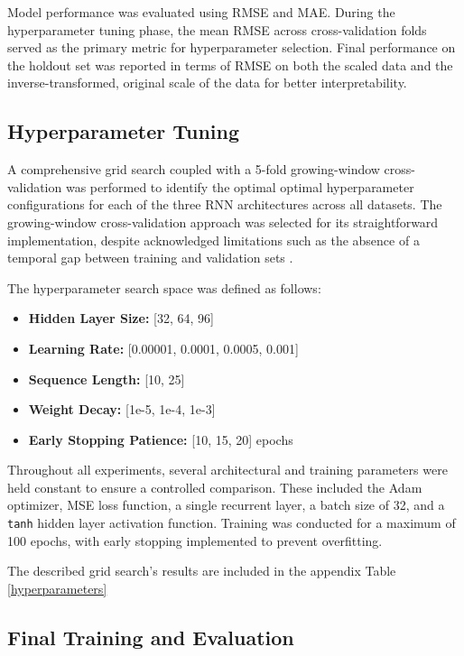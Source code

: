 \documentclass[conference, 10pt]{IEEEtran}
\begin{document}
Model performance was evaluated using RMSE and MAE. During the hyperparameter tuning phase, the mean RMSE across
cross-validation folds served as the primary metric for hyperparameter selection. Final performance on the holdout set
was reported in terms of RMSE on both the scaled data and the inverse-transformed, original scale of the data for better
interpretability.

\subsection{Hyperparameter Tuning}
A comprehensive grid search coupled with a 5-fold growing-window cross-validation was performed to identify the optimal
optimal hyperparameter configurations for each of the three RNN architectures across all datasets. The growing-window
cross-validation approach was selected for its straightforward implementation, despite acknowledged limitations such as
the absence of a temporal gap between training and validation sets \cite{CrossValidationTimeseries}.

The hyperparameter search space was defined as follows:

\begin{itemize}
    \item \textbf{Hidden Layer Size:} [32, 64, 96]
    \item \textbf{Learning Rate:} [0.00001, 0.0001, 0.0005, 0.001]
    \item \textbf{Sequence Length:} [10, 25]
    \item \textbf{Weight Decay:} [1e-5, 1e-4, 1e-3]
    \item \textbf{Early Stopping Patience:} [10, 15, 20] epochs
\end{itemize}

Throughout all experiments, several architectural and training parameters were held constant to ensure a controlled
comparison. These included the Adam optimizer, MSE loss function, a single recurrent layer, a batch
size of 32, and a \texttt{tanh} hidden layer activation function. Training was conducted for a maximum of 100 epochs,
with early stopping implemented to prevent overfitting.

The described grid search's results are included in the appendix Table \ref{hyperparameters}

\subsection{Final Training and Evaluation}
\end{document}

